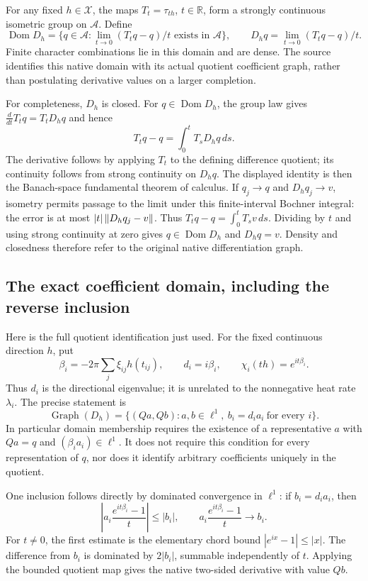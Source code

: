 \documentclass[11pt]{article}
\theoremstyle{remark}\newtheorem{remark}[theorem]{Remark}
\newcommand{\R}{\mathbb R}\newcommand{\C}{\mathbb C}
\newcommand{\A}{\mathcal A}\newcommand{\X}{\mathcal X}
\begin{document}
For any fixed $h\in\X$, the maps $T_t=\tau_{th}$, $t\in\R$, form a
strongly continuous isometric group on $\A$. Define
\[
 \operatorname{Dom}D_h=
 \{q\in\A:\lim_{t\to0}(T_tq-q)/t\text{ exists in }\A\},
 \qquad D_hq=\lim_{t\to0}(T_tq-q)/t.
\]
Finite character combinations lie in this domain and are dense.
The source identifies this native domain with its actual quotient
coefficient graph, rather than postulating derivative values on a
larger completion.

For completeness, $D_h$ is closed. For $q\in\operatorname{Dom}D_h$,
the group law gives $\frac d{dt}T_tq=T_tD_hq$ and hence
\[
 T_tq-q=\int_0^t T_sD_hq\,ds.
\]
The derivative follows by applying $T_t$ to the defining difference
quotient; its continuity follows from strong continuity on $D_hq$.
The displayed identity is then the Banach-space fundamental theorem
of calculus. If $q_j\to q$ and $D_hq_j\to v$, isometry permits passage
to the limit under this finite-interval Bochner integral: the error
is at most $|t|\left\lVert D_hq_j-v\right\rVert$. Thus $T_tq-q=\int_0^t T_sv\,ds$.
Dividing by $t$ and using strong continuity at zero gives $q\in
\operatorname{Dom}D_h$ and $D_hq=v$. Density and closedness therefore
refer to the original native differentiation graph.


\subsection*{The exact coefficient domain, including the reverse inclusion}
Here is the full quotient identification just used. For the fixed
continuous direction $h$, put
\[
 \beta_i=-2\pi\sum_j\xi_{ij}h(t_{ij}),\qquad d_i=i\beta_i,
 \qquad \chi_i(th)=e^{it\beta_i}.
\]
Thus $d_i$ is the directional eigenvalue; it is unrelated to the
nonnegative heat rate $\lambda_i$.
The precise statement is
\begin{equation}\label{eq:directional-full-graph}
 \operatorname{Graph}(D_h)=
 \{(Qa,Qb):a,b\in\ell^1,\ b_i=d_i a_i\ \text{for every }i\}.
\end{equation}
In particular domain membership requires the existence of a
representative $a$ with $Qa=q$ and $(\beta_i a_i)\in\ell^1$.
It does not require this condition for every representation of $q$,
nor does it identify arbitrary coefficients uniquely in the quotient.

One inclusion follows directly by dominated convergence in $\ell^1$:
if $b_i=d_i a_i$, then
\[
 \left|a_i\frac{e^{it\beta_i}-1}{t}\right|\leq|b_i|,
 \qquad
 a_i\frac{e^{it\beta_i}-1}{t}\longrightarrow b_i.
\]
For $t\ne0$, the first estimate is the elementary chord bound
$|e^{ix}-1|\leq|x|$. The difference from $b_i$ is dominated by
$2|b_i|$, summable independently of $t$. Applying the bounded
quotient map gives the native two-sided derivative with value $Qb$.
\end{document}
